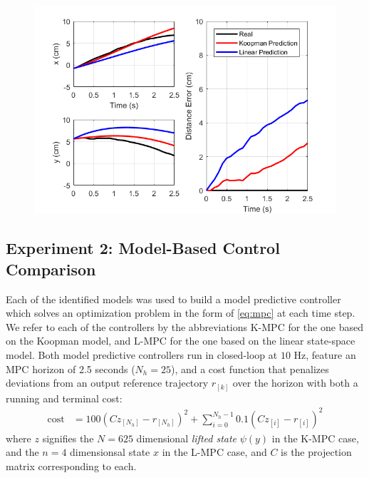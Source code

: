 \begin{figure}
    \centering
    \includegraphics[width=\linewidth]{figures/predictionComparison_ph.png}
    \caption{}
    \label{fig:predict}
\end{figure}




\subsection{Experiment 2: Model-Based Control Comparison}
\label{sec:mpcexp}

Each of the identified models was used to build a model predictive controller which solves an optimization problem in the form of \eqref{eq:mpc} at each time step.
We refer to each of the controllers by the abbreviations K-MPC for the one based on the Koopman model, and L-MPC for the one based on the linear state-space model.
Both model predictive controllers run in closed-loop at $10$ Hz, feature an MPC horizon of 2.5 seconds ($N_h = 25$), and a cost function that penalizes deviations from an output reference trajectory $r_{[k]}$ over the horizon with both a running and terminal cost:
\begin{align}
    \text{cost} &= 100 (C z_{[N_h]} - r_{[N_h]})^2 + \sum_{i=0}^{N_h - 1} 0.1 (C z_{[i]} - r_{[i]})^2
\end{align}
where $z$ signifies the $N=625$ dimensional \emph{lifted state} $\psi(y)$ in the K-MPC case, and the $n=4$ dimensionsal state $x$ in the L-MPC case, and $C$ is the projection matrix corresponding to each.

